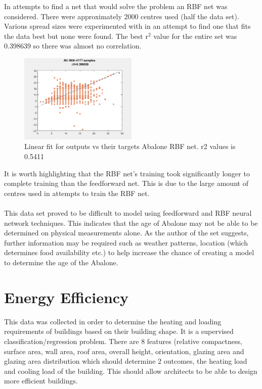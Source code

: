 \documentclass[10pt]{article}
\begin{document}
In attempts to find a net that would solve the problem an RBF net was considered. There were approximately 2000 centres used (half the data set). Various spread sizes were experimented with in an attempt to find one that fits the data best but none were found. The best r$^2$ value for the entire set was 0.398639 so there was almost no correlation. 
\begin{center}
\begin{figure}[h]
\centering
\includegraphics[width=0.50\textwidth]{abarbf_ar}
\caption{Linear fit for outputs vs their targets Abalone RBF net. r2 values is 0.5411}
\end{figure}
\end{center}
It is worth highlighting that the RBF net's training took significantly longer to complete training than the feedforward net. This is due to the large amount of centres used in attempts to train the RBF net.
\\
\\
This data set proved to be difficult to model using feedforward and RBF neural network techniques. This indicates that the age of Abalone may not be able to be determined on physical measurements alone. As the author of the set suggests, further information may be required such as weather patterns, location (which determines food availability etc.) to help increase the chance of creating a model to determine the age of the Abalone.
\newpage
\section{Energy Efficiency}
This data was collected in order to determine the heating and loading requirements of buildings based on their building shape. It is a supervised classification/regression problem. There are 8 features (relative compactness, surface area, wall area, roof area, overall height, orientation, glazing area and glazing area distribution which should determine 2 outcomes, the heating load and cooling load of the building. This should allow architects to be able to design more efficient buildings. 
\end{document}
